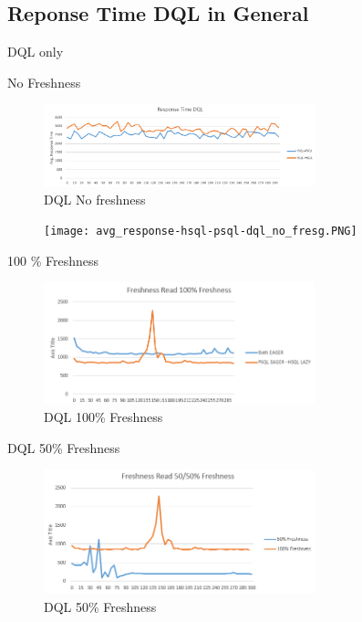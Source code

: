 \subsection*{Reponse Time DQL in General}

DQL only

No Freshness 
\begin{figure}[t] 
    \centering 
    \includegraphics[width=0.7\textwidth]{Figures/psq_hsql_avg_response_no_fresh_dql.PNG}
    \caption{DQL No freshness}
    \label{fig:}
\end{figure}

\begin{figure}[t] 
    \centering 
    \texttt{[image: avg\_response-hsql-psql-dql\_no\_fresg.PNG]}
    \caption{}
    \label{fig:}
\end{figure}




100 \% Freshness
\begin{figure}[t] 
    \centering 
    \includegraphics[width=0.7\textwidth]{Figures/100_fresh_dql.PNG}
    \caption{DQL 100\% Freshness }
    \label{fig:}
\end{figure}


DQL 50\% Freshness
\begin{figure}[t] 
    \centering 
    \includegraphics[width=0.7\textwidth]{Figures/50_fresh_dql.PNG}
    \caption{DQL 50\% Freshness}
    \label{fig:}
\end{figure}

